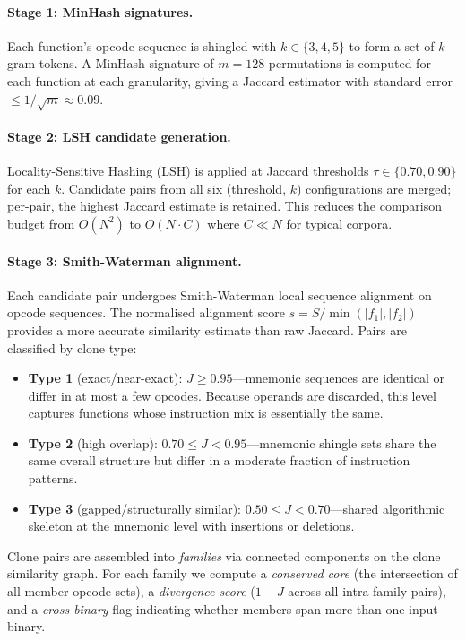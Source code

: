 \documentclass[10pt,twocolumn]{article}
\begin{document}
\paragraph{Stage 1: MinHash signatures.}
Each function's opcode sequence is shingled with $k \in \{3,4,5\}$ to form a
set of $k$-gram tokens.  A MinHash signature of $m = 128$ permutations is
computed for each function at each granularity, giving a Jaccard estimator
with standard error $\leq 1/\!\sqrt{m} \approx 0.09$.

\paragraph{Stage 2: LSH candidate generation.}
Locality-Sensitive Hashing (LSH) is applied at Jaccard thresholds
$\tau \in \{0.70, 0.90\}$ for each $k$.  Candidate pairs from all six
(threshold, $k$) configurations are merged; per-pair, the highest Jaccard
estimate is retained.  This reduces the comparison budget from
$O(N^2)$ to $O(N \cdot C)$ where $C \ll N$ for typical corpora.

\paragraph{Stage 3: Smith-Waterman alignment.}
Each candidate pair undergoes Smith-Waterman local sequence alignment on
opcode sequences.  The normalised alignment score
$s = S / \min(|f_1|, |f_2|)$ provides a more accurate similarity estimate
than raw Jaccard.  Pairs are classified by clone type:
\begin{itemize}
  \item \textbf{Type 1} (exact/near-exact): $J \geq 0.95$---mnemonic
        sequences are identical or differ in at most a few opcodes.
        Because operands are discarded, this level captures
        functions whose instruction mix is essentially the same.
  \item \textbf{Type 2} (high overlap): $0.70 \leq J < 0.95$---mnemonic
        shingle sets share the same overall structure but differ in a
        moderate fraction of instruction patterns.
  \item \textbf{Type 3} (gapped/structurally similar): $0.50 \leq J < 0.70$---shared
        algorithmic skeleton at the mnemonic level with insertions or
        deletions.
\end{itemize}

Clone pairs are assembled into \emph{families} via connected components on
the clone similarity graph.  For each family we compute a \emph{conserved
core} (the intersection of all member opcode sets), a \emph{divergence
score} ($1 - \bar{J}$ across all intra-family pairs), and a \emph{cross-binary}
flag indicating whether members span more than one input binary.
\end{document}
